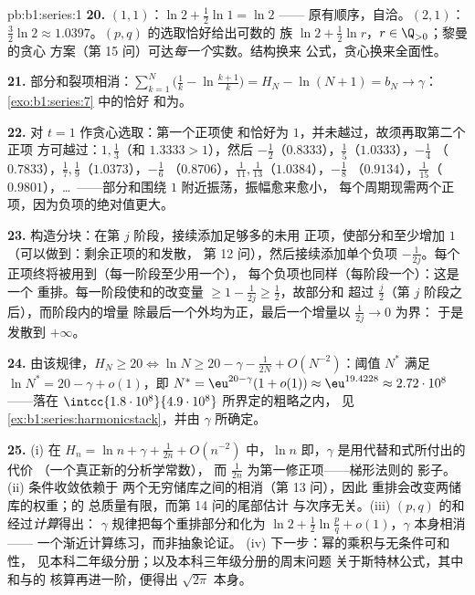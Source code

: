 \begin{solution}{pb:b1:series:1}
\textbf{20.} $(1,1)$：$\ln 2 + \frac12\ln 1 = \ln 2$ ——
原有顺序，自洽。$(2,1)$：$\frac32\ln 2 \approx
1.0397$。$(p,q)$ 的选取恰好给出可数的
族 $\ln 2 + \frac12\ln r$，$r \in \Q_{>0}$；黎曼的贪心
方案（第 15 问）可达\emph{每一个}实数。结构换来
公式，贪心换来全面性。

\textbf{21.} 部分和裂项相消：$\sum_{k=1}^{N}
\bigl(\frac1k - \ln\frac{k+1}{k}\bigr) = H_N - \ln(N+1) = b_N
\to \gamma$：\cref{exo:b1:series:7} 中的恰好
和为。

\textbf{22.} 对 $t = 1$ 作贪心选取：第一个正项使
和恰好为 $1$，并未越过，故须再取第二个正项
方可越过：$1, \frac13$（和 $1.3333 > 1$），然后
$-\frac12$（$0.8333$），$\frac15$（$1.0333$），$-\frac14$
（$0.7833$），$\frac17, \frac19$（$1.0373$），$-\frac16$
（$0.8706$），$\frac1{11}, \frac1{13}$（$1.0384$），$-\frac18$
（$0.9134$），$\frac1{15}$（$0.9801$），\dots\ ——部分和围绕
$1$ 附近振荡，振幅愈来愈小，
每个周期现需两个正项，因为负项的绝对值更大。

\textbf{23.} 构造分块：在第 $j$ 阶段，接续添加足够多的未用
正项，使部分和至少增加 $1$
（可以做到：剩余正项的和发散，
第 12 问），然后接续添加单个负项 $-\frac{1}
{2j}$。每个正项终将被用到（每一阶段至少用一个），
每个负项也同样（每阶段一个）：这是一个
重排。每一阶段使和的改变量 $\geq 1 -
\frac{1}{2j} \geq \frac12$，故部分和
超过 $\frac{j}{2}$（第 $j$ 阶段之后），而阶段内的增量
除最后一个外均为正，最后一个增量以 $\frac{1}{2j} \to 0$ 为界：
于是发散到 $+\infty$。

\textbf{24.} 由该规律，$H_N \geq 20 \iff \ln N \geq 20 -
\gamma - \frac{1}{2N} + O(N^{-2})$：阈值 $N^*$
满足 $\ln N^* = 20 - \gamma + o(1)$，即 $N^* =
\eu^{20 - \gamma}(1 + o(1)) \approx \eu^{19.4228} \approx
2.72\cdot10^{8}$ ——落在
$\intcc{1.8\cdot10^8}{4.9\cdot10^8}$ 所界定的粗略之内，
见 \cref{ex:b1:series:harmonicstack}，并由 $\gamma$ 所确定。

\textbf{25.} (i) 在 $H_n = \ln n + \gamma + \frac{1}{2n} +
O(n^{-2})$ 中，$\ln n$ 即，$\gamma$ 是用代替和式所付出的代价
（一个真正新的分析学常数），
而 $\frac{1}{2n}$ 为第一修正项——梯形法则的
影子。(ii) 条件收敛依赖于
两个无穷储库之间的相消（第 13 问），因此
重排会改变两储库的权重；的
总质量有限，而第 14 问的尾部估计
与次序无关。(iii) $(p,q)$ 的和经过\emph{计算}得出：
$\gamma$ 规律把每个重排部分和化为 $\ln 2 +
\frac12\ln\frac pq + o(1)$，$\gamma$ 本身相消——
一个渐近计算练习，而非抽象论证。
(iv) 下一步：幂的乘积与无条件可和性，
见本科二年级分册；以及本科三年级分册的周末问题
关于斯特林公式，其中和与的
核算再进一阶，便得出 $\sqrt{2\pi}$
本身。
\end{solution}
